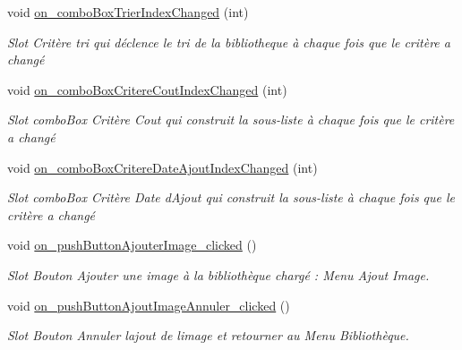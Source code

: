 \begin{DoxyCompactItemize}
void \hyperlink{classMainWindow_ab6cdf8f1b4ab60072dc0ba1940e3544d}{on\+\_\+combo\+Box\+Trier\+Index\+Changed} (int)
\begin{DoxyCompactList}\small\item\em Slot Critère tri qui déclence le tri de la bibliotheque à chaque fois que le critère a changé \end{DoxyCompactList}\item 
\mbox{\label{classMainWindow_a4ce966ee5dac14ecc0d7faf13fbe974d}} 
void \hyperlink{classMainWindow_a4ce966ee5dac14ecc0d7faf13fbe974d}{on\+\_\+combo\+Box\+Critere\+Cout\+Index\+Changed} (int)
\begin{DoxyCompactList}\small\item\em Slot combo\+Box Critère Cout qui construit la sous-\/liste à chaque fois que le critère a changé \end{DoxyCompactList}\item 
\mbox{\label{classMainWindow_afd34abf465e165a2d8e3aa3b65451ee9}} 
void \hyperlink{classMainWindow_afd34abf465e165a2d8e3aa3b65451ee9}{on\+\_\+combo\+Box\+Critere\+Date\+Ajout\+Index\+Changed} (int)
\begin{DoxyCompactList}\small\item\em Slot combo\+Box Critère Date d\textquotesingle{}Ajout qui construit la sous-\/liste à chaque fois que le critère a changé \end{DoxyCompactList}\item 
\mbox{\label{classMainWindow_a16d6f34d51ccffec28fc667cce4c4800}} 
void \hyperlink{classMainWindow_a16d6f34d51ccffec28fc667cce4c4800}{on\+\_\+push\+Button\+Ajouter\+Image\+\_\+clicked} ()
\begin{DoxyCompactList}\small\item\em Slot Bouton Ajouter une image à la bibliothèque chargé \+: Menu Ajout Image. \end{DoxyCompactList}\item 
\mbox{\label{classMainWindow_af8e692c3bce912dbdaf87e66db8ed9bc}} 
void \hyperlink{classMainWindow_af8e692c3bce912dbdaf87e66db8ed9bc}{on\+\_\+push\+Button\+Ajout\+Image\+Annuler\+\_\+clicked} ()
\begin{DoxyCompactList}\small\item\em Slot Bouton Annuler l\textquotesingle{}ajout de l\textquotesingle{}image et retourner au Menu Bibliothèque. \end{DoxyCompactList}\item 

\end{DoxyCompactItemize}
